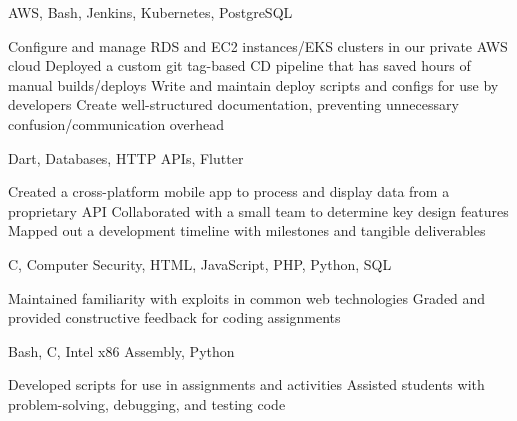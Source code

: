 \documentclass[12pt,letterpaper]{article}
\begin{document}
\begin{experiencesection}
    {AWS, Bash, Jenkins, Kubernetes, PostgreSQL}{
        \begin{details}
            \detail Configure and manage RDS and EC2 instances/EKS clusters in our private AWS cloud
            \detail Deployed a custom git tag-based CD pipeline that has saved hours of manual builds/deploys
            \detail Write and maintain deploy scripts and configs for use by developers
            \detail Create well-structured documentation, preventing unnecessary confusion/communication overhead
        \end{details}
    }
    {Dart, Databases, HTTP APIs, Flutter}{
        \begin{details}
            \detail Created a cross-platform mobile app to process and display data from a proprietary API
            \detail Collaborated with a small team to determine key design features
            \detail Mapped out a development timeline with milestones and tangible deliverables
        \end{details}
    }
    {C, Computer Security, HTML, JavaScript, PHP, Python, SQL}{
        \begin{details}
            \detail Maintained familiarity with exploits in common web technologies
            \detail Graded and provided constructive feedback for coding assignments
        \end{details}
    }
    {Bash, C, Intel x86 Assembly, Python}{
        \begin{details}
            \detail Developed scripts for use in assignments and activities
            \detail Assisted students with problem-solving, debugging, and testing code
        \end{details}
    }
\end{experiencesection}
\end{document}
